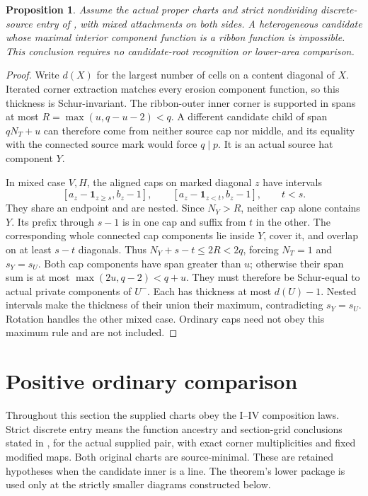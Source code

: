 \documentclass[11pt,a4paper]{amsart}
\numberwithin{equation}{section}
\theoremstyle{plain}
\newtheorem{proposition}[theorem]{Proposition}
\theoremstyle{definition}
\begin{document}
\begin{proposition}\label{prop:heterogeneous-ribbon}
Assume the actual proper charts and strict nondividing discrete-source entry of , with mixed attachments on both sides.  A heterogeneous candidate whose maximal interior component function is a ribbon function is impossible.  This conclusion requires no candidate-root recognition or lower-area comparison.
\end{proposition}
\begin{proof}
Write \(d(X)\) for the largest number of cells on a content diagonal of \(X\).  Iterated corner extraction matches every erosion component function, so this thickness is Schur-invariant.  The ribbon-outer inner corner is supported in spans at most \(R=\max(u,q-u-2)<q\).  A different candidate child of span \(qN_T+u\) can therefore come from neither source cap nor middle, and its equality with the connected source mark would force \(q\mid p\).  It is an actual source hat component \(Y\).

In mixed case \(V,H\), the aligned caps on marked diagonal \(z\) have intervals
\[
 [a_z-\mathbf1_{z\ge s},b_z-1],\qquad
 [a_z-\mathbf1_{z<t},b_z-1],\qquad t<s.
\]
They share an endpoint and are nested.  Since \(N_Y>R\), neither cap alone contains \(Y\).  Its prefix through \(s-1\) is in one cap and suffix from \(t\) in the other.  The corresponding whole connected cap components lie inside \(Y\), cover it, and overlap on at least \(s-t\) diagonals.  Thus \(N_Y+s-t\le2R<2q\), forcing \(N_T=1\) and \(s_Y=s_U\).  Both cap components have span greater than \(u\); otherwise their span sum is at most \(\max(2u,q-2)<q+u\).  They must therefore be Schur-equal to actual private components of \(U^-\).  Each has thickness at most \(d(U)-1\).  Nested intervals make the thickness of their union their maximum, contradicting \(s_Y=s_U\).  Rotation handles the other mixed case.  Ordinary caps need not obey this maximum rule and are not included.
\end{proof}

\section{Positive ordinary comparison}\label{sec:positive-oo}
Throughout this section the supplied charts obey the I--IV composition laws.  Strict discrete entry means the function ancestry and section-grid conclusions stated in , for the actual supplied pair, with exact corner multiplicities and fixed modified maps.  Both original charts are source-minimal.  These are retained hypotheses when the candidate inner is a line.  The theorem's lower package is used only at the strictly smaller diagrams constructed below.
\end{document}

